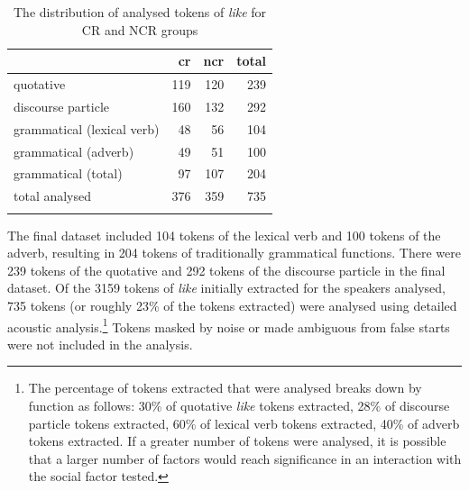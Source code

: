  
        
\begin{table}[t]
\caption{The distribution of analysed tokens of \textit{like} for CR and NCR groups}
  \label{tab:tokensanalysed}
	 \begin{center}
		\begin{tabular}{lrrr}\lsptoprule
	
		& \sc cr 	&	 \sc ncr & \sc total \\
              
  \midrule
  
quotative & 119 & 120 & 239 \\
discourse particle & 160 & 132 & 292 \\
grammatical (lexical verb) & 48 & 56 & 104\\
grammatical (adverb) & 49  & 51 & 100 \\
grammatical (total) & 97 & 107 & 204 \\
total analysed      & 376 & 359 & 735 \\

\lspbottomrule
		\end{tabular}
	
	\end{center}
\end{table}

\newpage
The final dataset included 104 tokens of the lexical verb and 100 tokens of the adverb, resulting in 204 tokens of traditionally grammatical functions. There were 239 tokens of the quotative and 292 tokens of the discourse particle in the final dataset. Of the 3159 tokens of \textit{like} initially extracted for the speakers analysed, 735 tokens (or roughly	23\% of the tokens extracted) were analysed using detailed acoustic analysis.\footnote{The percentage of tokens extracted that were analysed breaks down by function as follows: 30\% of quotative \textit{like} tokens extracted, 28\% of discourse particle tokens extracted, 60\% of lexical verb tokens extracted, 40\% of adverb tokens extracted. If a greater number of tokens were analysed, it is possible that a larger number of factors would reach significance in an interaction with the social factor tested.} Tokens masked by noise or made ambiguous from false starts were not included in the analysis. 


